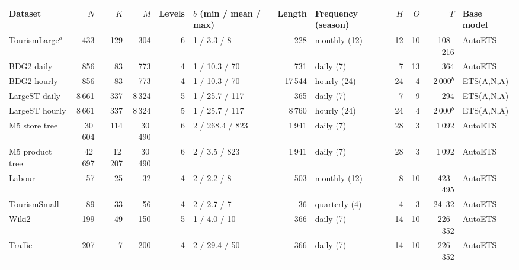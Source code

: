 \scriptsize\setlength{\tabcolsep}{3pt}
\begin{tabular}{l rrrr l r l rr r l}
\toprule
Dataset & $N$ & $K$ & $M$ & Levels & $b$ (min / mean / max) & Length & Frequency (season) & $H$ & $O$ & $T$ & Base model\\
\midrule
TourismLarge$^{a}$ & 433 & 129 & 304 & 6 & 1 / 3.3 / 8 & 228 & monthly (12) & 12 & 10 & 108--216 & AutoETS\\
BDG2 daily & 856 & 83 & 773 & 4 & 1 / 10.3 / 70 & 731 & daily (7) & 7 & 13 & 364 & AutoETS\\
BDG2 hourly & 856 & 83 & 773 & 4 & 1 / 10.3 / 70 & 17\,544 & hourly (24) & 24 & 4 & 2\,000$^{b}$ & ETS(A,N,A)\\
LargeST daily & 8\,661 & 337 & 8\,324 & 5 & 1 / 25.7 / 117 & 365 & daily (7) & 7 & 9 & 294 & ETS(A,N,A)\\
LargeST hourly & 8\,661 & 337 & 8\,324 & 5 & 1 / 25.7 / 117 & 8\,760 & hourly (24) & 24 & 4 & 2\,000$^{b}$ & ETS(A,N,A)\\
M5 store tree & 30\,604 & 114 & 30\,490 & 6 & 2 / 268.4 / 823 & 1\,941 & daily (7) & 28 & 3 & 1\,092 & AutoETS\\
M5 product tree & 42\,697 & 12\,207 & 30\,490 & 6 & 2 / 3.5 / 823 & 1\,941 & daily (7) & 28 & 3 & 1\,092 & AutoETS\\
\midrule
Labour & 57 & 25 & 32 & 4 & 2 / 2.2 / 8 & 503 & monthly (12) & 8 & 10 & 423--495 & AutoETS\\
TourismSmall & 89 & 33 & 56 & 4 & 2 / 2.7 / 7 & 36 & quarterly (4) & 4 & 3 & 24--32 & AutoETS\\
Wiki2 & 199 & 49 & 150 & 5 & 1 / 4.0 / 10 & 366 & daily (7) & 14 & 10 & 226--352 & AutoETS\\
Traffic & 207 & 7 & 200 & 4 & 2 / 29.4 / 50 & 366 & daily (7) & 14 & 10 & 226--352 & AutoETS\\
\bottomrule
\end{tabular}
